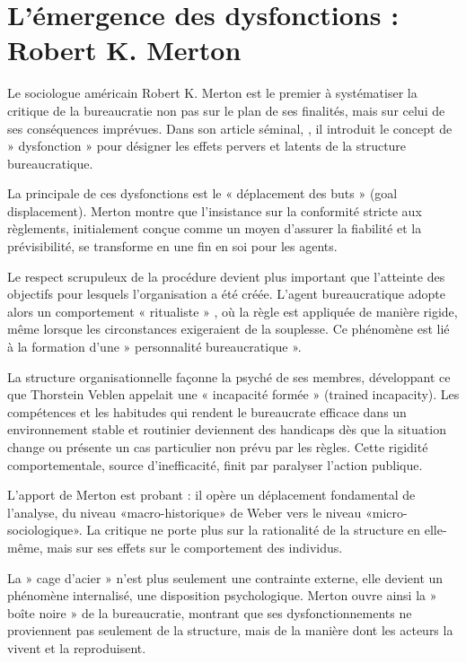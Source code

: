 \section{L'émergence des dysfonctions : Robert K. Merton}

Le sociologue américain Robert K. Merton est le premier à systématiser la critique de la bureaucratie non pas sur le plan de ses finalités, mais sur celui de ses conséquences imprévues. Dans son article séminal, \citep{Merton1940}, il introduit le concept de » dysfonction »  pour désigner les effets pervers et latents de la structure bureaucratique.

La principale de ces dysfonctions est le « déplacement des buts »  (goal displacement). Merton montre que l'insistance sur la conformité stricte aux règlements, initialement conçue comme un moyen d'assurer la fiabilité et la prévisibilité, se transforme en une fin en soi pour les agents.

Le respect scrupuleux de la procédure devient plus important que l'atteinte des objectifs pour lesquels l'organisation a été créée. L'agent bureaucratique adopte alors un comportement « ritualiste » , où la règle est appliquée de manière rigide, même lorsque les circonstances exigeraient de la souplesse.
Ce phénomène est lié à la formation d'une » personnalité bureaucratique ».

La structure organisationnelle façonne la psyché de ses membres, développant ce que Thorstein Veblen appelait une « incapacité formée »  (trained incapacity). Les compétences et les habitudes qui rendent le bureaucrate efficace dans un environnement stable et routinier deviennent des handicaps dès que la situation change ou présente un cas particulier non prévu par les règles. Cette rigidité comportementale, source d'inefficacité, finit par paralyser l'action publique.

L'apport de Merton est probant : il opère un déplacement fondamental de l'analyse, du niveau «macro-historique» de Weber vers le niveau «micro-sociologique». La critique ne porte plus sur la rationalité de la structure en elle-même, mais sur ses effets sur le comportement des individus. 

La » cage d'acier »  n'est plus seulement une contrainte externe, elle devient un phénomène internalisé, une disposition psychologique. Merton ouvre ainsi la » boîte noire »  de la bureaucratie, montrant que ses dysfonctionnements ne proviennent pas seulement de la structure, mais de la manière dont les acteurs la vivent et la reproduisent.

